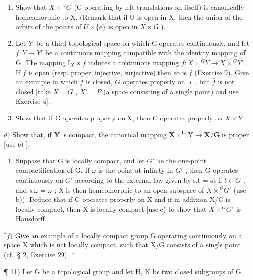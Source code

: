 \begin{enumerate}
\def\labelenumi{\alph{enumi})}
\item
  Show that \(X \times {}^{G}G\) (G operating by left translations on itself) is canonically homeomorphic to X. (Remark that if U is open in X, then the union of the orbits of the points of \(U \times \{e\}\) is open in \(X \times G\) ).
\item
  Let \(Y'\) be a third topological space on which G operates continuously, and let \(f: Y \to Y'\) be a continuous mapping compatible with the identity mapping of G. The mapping \(\mathrm{I}_{X} \times f\) induces a continuous mapping \(\bar{f}: X \times {}^{G}Y \to X \times {}^{G}Y'\) . If \(f\) is open (resp. proper, injective, surjective) then so is \(\bar{f}\) (Exercise 9). Give an example in which \(f\) is closed, \(G\) operates properly on \(X\) , but \(\bar{f}\) is not closed {[}take \(X = G\) , \(X' = P\) (a space consisting of a single point) and use Exercise 4{]}.
\item
  Show that if G operates properly on X, then G operates properly on \(X \times Y\) .
\end{enumerate}

\(d)\) Show that, if \(\mathbf{Y}\) is compact, the canonical mapping \(\mathbf{X} \times^{\mathbf{G}}\mathbf{Y} \to \mathbf{X}/\mathbf{G}\) is proper {[}use \(b)\) {]}.

\begin{enumerate}
\def\labelenumi{\alph{enumi})}
\setcounter{enumi}{4}
\tightlist
\item
  Suppose that G is locally compact, and let \(G'\) be the one-point compactification of G. If \(\omega\) is the point at infinity in \(G'\) , then G operates continuously on \(G'\) according to the external law given by s.t = st if \(t \in G\) , and \(s.\omega = \omega\) ; X is then homeomorphic to an open subspace of \(X \times {}^{G}G'\) (use b)). Deduce that if G operates properly on X and if in addition X/G is locally compact, then X is locally compact {[}use c) to show that \(X \times {}^{G}G'\) is Hausdorff{]}.
\end{enumerate}

\(^{*}f)\) Give an example of a locally compact group G operating continuously on a space X which is not locally compact, such that X/G consists of a single point (cf.~§ 2, Exercise 29). *

¶ 11) Let G be a topological group and let H, K be two closed subgroups of G.

